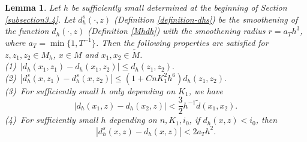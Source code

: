\documentclass[11pt,letterpaper]{amsart}
\numberwithin{equation}{section}
\theoremstyle{definition}
\theoremstyle{plain}
\theoremstyle{definition}
\theoremstyle{plain}
\theoremstyle{definition}
\theoremstyle{plain}
\newtheorem{dhs}[riccati]{Lemma}
\begin{document}
\begin{dhs}\label{dhs}
Let $h$ be sufficiently small determined at the beginning of Section \ref{subsection3.4}. Let $d_h^s(\cdot,z)$ (Definition \ref{definition-dhs}) be the smoothening of the function $d_h(\cdot,z)$ (Definition \ref{Mhdh}) with the smoothening radius $r=a_T h^3$, where $a_T=\min\{1,T^{-1}\}$. Then the following properties are satisfied for $z,z_1,z_2\in M_h$, $x\in M$ and $x_1,x_2\in \widetilde{M}$.\\
(1) \,$|d_h(x_1,z_1)-d_h(x_1,z_2)|\leqslant d_h(z_1,z_2).$\\
(2) \,$|d_h^s(x,z_1)-d_h^s(x,z_2)|\leqslant (1+CnK_1^2 h^6)d_h(z_1,z_2).$ \\
(3) \,For sufficiently small $h$ only depending on $K_1$, we have
$$|d_h(x_1,z)-d_h(x_2,z)|<\frac{3}{2}h^{-1}\widetilde{d}(x_1,x_2).$$
(4) \,For sufficiently small $h$ depending on $n,K_1,i_0$, if $d_h(x,z)<i_0$, then 
$$|d_h^s(x,z)-d_h(x,z)|<2a_T h^2.$$
\end{dhs}
\end{document}
